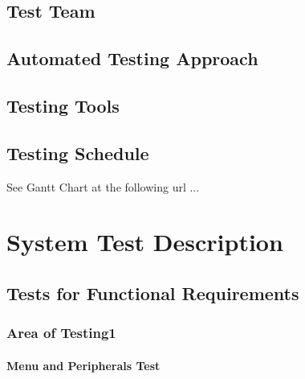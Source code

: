 \documentclass[12pt, titlepage]{article}
\begin{document}
\subsection{Test Team}

\subsection{Automated Testing Approach}

\subsection{Testing Tools}

\subsection{Testing Schedule}
		
See Gantt Chart at the following url ...

\section{System Test Description}
	
\subsection{Tests for Functional Requirements}

\subsubsection{Area of Testing1}
		
\paragraph{Menu and Peripherals Test}
\end{document}
